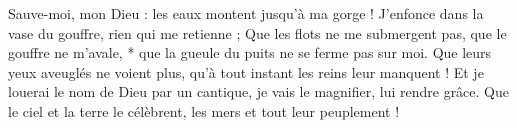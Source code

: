 Sauve-moi, mon Dieu : les eaux montent jusqu'à ma gorge !
\versseparator
J'enfonce dans la vase du gouffre, rien qui me retienne ;
\versseparator
Que les flots ne me submergent pas, que le gouffre ne m'avale, * que la gueule du puits ne se ferme pas sur moi.
\versseparator
Que leurs yeux aveuglés ne voient plus, qu'à tout instant les reins leur manquent !
\versseparator
Et je louerai le nom de Dieu par un cantique, je vais le magnifier, lui rendre grâce.
\versseparator
Que le ciel et la terre le célèbrent, les mers et tout leur peuplement !
